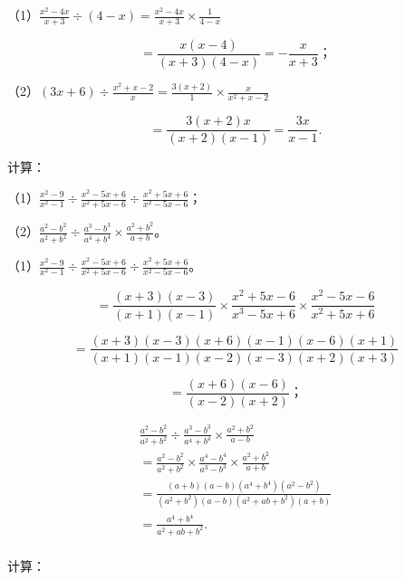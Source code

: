 （1）\(\frac{x^2 - 4x}{x + 3} \div (4 - x) = \frac{x^2 - 4x}{x + 3} \times \frac{1}{4 - x}\)

\[
= \frac{x (x - 4)}{(x + 3) (4 - x)} = - \frac{x}{x + 3}\text{；}
\]

（2）\((3x + 6) \div \frac{x^2 + x - 2}{x} = \frac{3(x + 2)}{1} \times \frac{x}{x^2 + x - 2}\)

\[
= \frac{3 (x + 2) x}{(x + 2) (x - 1)} = \frac{3 x}{x - 1}.
\]

 计算：

（1）\(\frac{x^2 - 9}{x^2 - 1} \div \frac{x^2 - 5x + 6}{x^2 + 5x - 6} \div \frac{x^2 + 5x + 6}{x^2 - 5x - 6}\)；

（2）\(\frac{a^2 - b^2}{a^2 + b^2} \div \frac{a^3 - b^3}{a^4 + b^4} \times \frac{a^2 + b^2}{a + b}\)。

（1）\(\frac{x^2 - 9}{x^2 - 1} \div \frac{x^2 - 5x + 6}{x^2 + 5x - 6} \div \frac{x^2 + 5x + 6}{x^2 - 5x - 6}\)。

\[
= \frac{(x + 3) (x - 3)}{(x + 1) (x - 1)} \times \frac{x ^{2} + 5 x - 6}{x ^{3} - 5 x + 6} \times \frac{x ^{2} - 5 x - 6}{x ^{2} + 5 x + 6}
\]

\[
= \frac{(x + 3) (x - 3) (x + 6) (x - 1) (x - 6) (x + 1)}{(x + 1) (x - 1) (x - 2) (x - 3) (x + 2) (x + 3)}
\]

\[
= \frac{(x + 6) (x - 6)}{(x - 2) (x + 2)}\text{；}
\]

\[
\begin{array}{l} \frac{a ^{2} - b ^{2}}{a ^{2} + b ^{2}} \div \frac{a ^{3} - b ^{3}}{a ^{4} + b ^{4}} \times \frac{a ^{2} + b ^{2}}{a - b} \\ = \frac{a ^{2} - b ^{2}}{a ^{2} + b ^{2}} \times \frac{a ^{4} - b ^{4}}{a ^{3} - b ^{3}} \times \frac{a ^{2} + b ^{2}}{a + b} \\ = \frac{(a + b) (a - b) (a ^{4} + b ^{4}) (a ^{2} - b ^{2})}{(a ^{2} + b ^{2}) (a - b) (a ^{2} + a b + b ^{2}) (a + b)} \\ = \frac{a ^{4} + b ^{4}}{a ^{2} + a b + b ^{2}}. \\ \end{array}
\]

计算：

